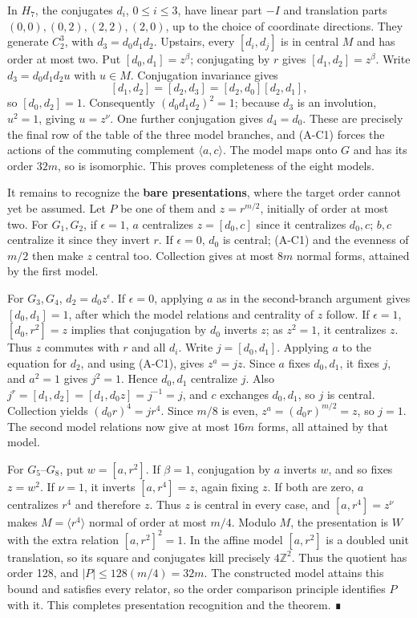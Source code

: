In \(H_7\), the conjugates \(d_i\), \(0\le i\le3\), have linear part \(-I\) and translation parts \((0,0),\allowbreak(0,2),\allowbreak(2,2),\allowbreak(2,0)\), up to the choice of coordinate directions. They generate \(C_2^3\), with \(d_3=d_0d_1d_2\). Upstairs, every \([d_i,d_j]\) is in central \(M\) and has order at most two. Put \([d_0,d_1]=z^\beta\); conjugating by \(r\) gives \([d_1,d_2]=z^\beta\). Write \(d_3=d_0d_1d_2u\) with \(u\in M\). Conjugation invariance gives \[
 [d_1,d_2]=[d_2,d_3]=[d_2,d_0][d_2,d_1],
\] so \([d_0,d_2]=1\). Consequently \((d_0d_1d_2)^2=1\); because \(d_3\) is an involution, \(u^2=1\), giving \(u=z^\nu\). One further conjugation gives \(d_4=d_0\). These are precisely the final row of the table of the three model branches, and (A-C1) forces the actions of the commuting complement \(\langle a,c\rangle\). The model maps onto \(G\) and has its order \(32m\), so is isomorphic. This proves completeness of the eight models.

It remains to recognize the \textbf{bare presentations}, where the target order cannot yet be assumed. Let \(P\) be one of them and \(z=r^{m/2}\), initially of order at most two. For \(G_1,G_2\), if \(\epsilon=1\), \(a\) centralizes \(z=[d_0,c]\) since it centralizes \(d_0,c\); \(b,c\) centralize it since they invert \(r\). If \(\epsilon=0\), \(d_0\) is central; (A-C1) and the evenness of \(m/2\) then make \(z\) central too. Collection gives at most \(8m\) normal forms, attained by the first model.

For \(G_3,G_4\), \(d_2=d_0z^\epsilon\). If \(\epsilon=0\), applying \(a\) as in the second-branch argument gives \([d_0,d_1]=1\), after which the model relations and centrality of \(z\) follow. If \(\epsilon=1\), \([d_0,r^2]=z\) implies that conjugation by \(d_0\) inverts \(z\); as \(z^2=1\), it centralizes \(z\). Thus \(z\) commutes with \(r\) and all \(d_i\). Write \(j=[d_0,d_1]\). Applying \(a\) to the equation for \(d_2\), and using (A-C1), gives \(z^a=jz\). Since \(a\) fixes \(d_0,d_1\), it fixes \(j\), and \(a^2=1\) gives \(j^2=1\). Hence \(d_0,d_1\) centralize \(j\). Also \(j^r=[d_1,d_2]=[d_1,d_0z]=j^{-1}=j\), and \(c\) exchanges \(d_0,d_1\), so \(j\) is central. Collection yields \((d_0r)^4=j r^4\). Since \(m/8\) is even, \(z^a=(d_0r)^{m/2}=z\), so \(j=1\). The second model relations now give at most \(16m\) forms, all attained by that model.

For \(G_5\)--\(G_8\), put \(w=[a,r^2]\). If \(\beta=1\), conjugation by \(a\) inverts \(w\), and so fixes \(z=w^2\). If \(\nu=1\), it inverts \([a,r^4]=z\), again fixing \(z\). If both are zero, \(a\) centralizes \(r^4\) and therefore \(z\). Thus \(z\) is central in every case, and \([a,r^4]=z^\nu\) makes \(M=\langle r^4\rangle\) normal of order at most \(m/4\). Modulo \(M\), the presentation is \(W\) with the extra relation \([a,r^2]^2=1\). In the affine model \([a,r^2]\) is a doubled unit translation, so its square and conjugates kill precisely \(4\mathbb Z^2\). Thus the quotient has order 128, and \(|P|\le128(m/4)=32m\). The constructed model attains this bound and satisfies every relator, so the order comparison principle identifies \(P\) with it. This completes presentation recognition and the theorem. ∎

